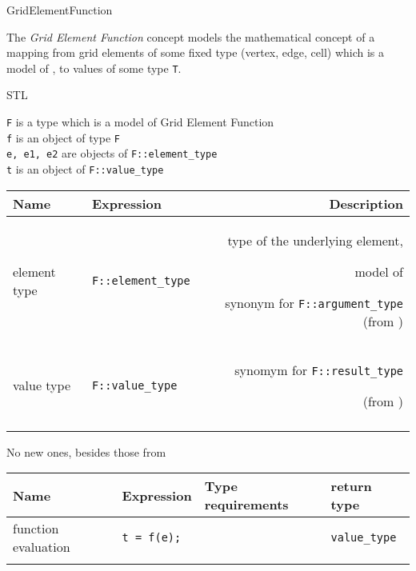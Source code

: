 \begin{Label}{GridElementFunction}
\end{Label}

The {\em Grid Element Function\/} concept 
models the mathematical concept of a mapping from
grid elements of some fixed type (vertex, edge, cell)
which is a model of ,
to values of  some type {\tt T}.

STL 

{\tt F} is a type which is a model of  Grid Element Function 
\\
{\tt f} is an object of type  {\tt F}
\\
{\tt e, e1, e2} are objects of  {\tt F::element\_type}
\\
{\tt t} is an object of  {\tt F::value\_type}


\noindent
\begin{tabularx}{14cm}{llR}  
  \hline
  \bf  Name  &\bf  Expression  &\bf  Description   \\ 
  \hline
  element type  & 
  {\tt F::element\_type} &
  type of the underlying element, 
  \par model of  
  \par synonym for {\tt F::argument\_type}
  (from )
  \\
  value type  &
  {\tt F::value\_type} &
  synomym for {\tt F::result\_type}   
  \par (from )
  \\ 
  \hline
  \\
\end{tabularx}
    
No new ones, besides those from 

\noindent
\begin{tabular}{llll} \\
  \hline
  \bf  Name  &\bf  Expression  &\bf  Type requirements  & \bf  return type  \\ 
  \hline
  function evaluation  &
  {\tt t = f(e);} &
  ~      &
  {\tt value\_type} 
  \\ 
  \hline
  \\
\end{tabular}

